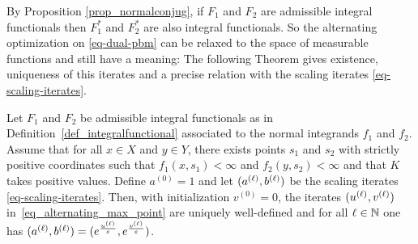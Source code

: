 %
By Proposition \ref{prop_normalconjug}, if $F_1$ and $F_2$ are admissible integral functionals then $F^*_1$ and $F^*_2$ are also integral functionals. So the alternating optimization on \eqref{eq-dual-pbm} can be relaxed to the space of measurable functions and still have a meaning:
%
The following Theorem gives existence, uniqueness of this iterates and a precise relation with the scaling iterates \eqref{eq-scaling-iterates}.
%
\begin{theorem}
\label{thm-sinkhorn-div}
Let $F_1$ and $F_2$ be admissible integral functionals as in Definition~\eqref{def_integralfunctional} associated to the normal integrands $f_1$ and $f_2$.
%
Assume that for all $x\in X$ and $y\in Y$, there exists points $s_1$ and $s_2$ with strictly positive coordinates such that $f_1(x,s_1)<\infty$ and $f_2 (y,s_2)<\infty$ and that $K$ takes positive values.
%
Define $a^{(0)}=1$ and let $(a^{(\ell)},b^{(\ell)})$ be the scaling iterates \eqref{eq-scaling-iterates}.
%
Then, with initialization $v^{(0)}=0$, the iterates $(u^{(\ell)},v^{(\ell)})$ in~\eqref{eq_alternating_max_point} are uniquely well-defined and for all $\ell \in \mathbb{N}$ one has $(a^{(\ell)},b^{(\ell)}) = (e^{\frac{u^{(\ell)}}{\varepsilon}},e^{\frac{v^{(\ell)}}{\varepsilon}})$.
%
\end{theorem}
%
